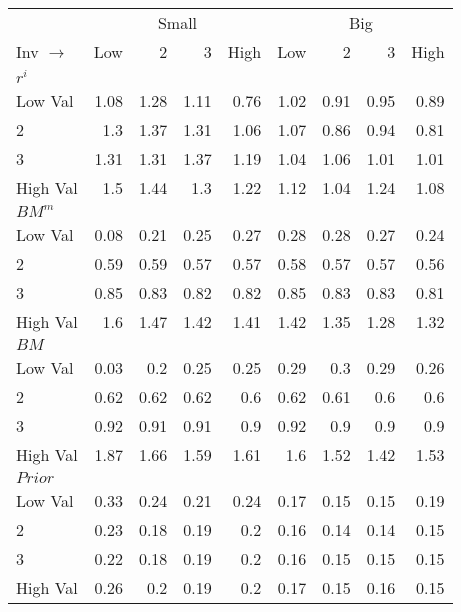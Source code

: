 
\footnotesize
\centering
\label{tbl:32_Size_BM_Inv_Sorts}
\begin{tabular}{lrrrrrrrr}
  \toprule
    & \multicolumn{4}{c}{Small} & \multicolumn{4}{c}{Big} \\
      \cmidrule(r){2-5} \cmidrule(r){6-9}
  Inv $\rightarrow$ & Low & 2 & 3 & High & Low & 2 & 3 & High \\ 
  \midrule
  

    \multicolumn{9}{l}{$r^i$} \\
    Low Val    & 1.08  & 1.28  & 1.11  & 0.76  & 1.02  & 0.91  & 0.95  & 0.89  \\
           2   & 1.3  & 1.37  & 1.31  & 1.06  & 1.07  & 0.86  & 0.94  & 0.81  \\
           3   & 1.31  & 1.31  & 1.37  & 1.19  & 1.04  & 1.06  & 1.01  & 1.01  \\
    High Val   & 1.5  & 1.44  & 1.3  & 1.22  & 1.12  & 1.04  & 1.24  & 1.08  \\
    [1em]
  

    \multicolumn{9}{l}{$BM^m$} \\
    Low Val    & 0.08  & 0.21  & 0.25  & 0.27  & 0.28  & 0.28  & 0.27  & 0.24  \\
           2   & 0.59  & 0.59  & 0.57  & 0.57  & 0.58  & 0.57  & 0.57  & 0.56  \\
           3   & 0.85  & 0.83  & 0.82  & 0.82  & 0.85  & 0.83  & 0.83  & 0.81  \\
    High Val   & 1.6  & 1.47  & 1.42  & 1.41  & 1.42  & 1.35  & 1.28  & 1.32  \\
    [1em]
  

    \multicolumn{9}{l}{$BM$} \\
    Low Val    & 0.03  & 0.2  & 0.25  & 0.25  & 0.29  & 0.3  & 0.29  & 0.26  \\
           2   & 0.62  & 0.62  & 0.62  & 0.6  & 0.62  & 0.61  & 0.6  & 0.6  \\
           3   & 0.92  & 0.91  & 0.91  & 0.9  & 0.92  & 0.9  & 0.9  & 0.9  \\
    High Val   & 1.87  & 1.66  & 1.59  & 1.61  & 1.6  & 1.52  & 1.42  & 1.53  \\
    [1em]
  

    \multicolumn{9}{l}{$Prior$} \\
    Low Val    & 0.33  & 0.24  & 0.21  & 0.24  & 0.17  & 0.15  & 0.15  & 0.19  \\
           2   & 0.23  & 0.18  & 0.19  & 0.2  & 0.16  & 0.14  & 0.14  & 0.15  \\
           3   & 0.22  & 0.18  & 0.19  & 0.2  & 0.16  & 0.15  & 0.15  & 0.15  \\
    High Val   & 0.26  & 0.2  & 0.19  & 0.2  & 0.17  & 0.15  & 0.16  & 0.15  \\
    [1em]
  


\end{tabular}
